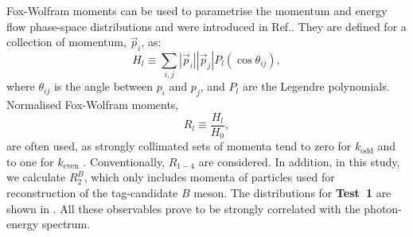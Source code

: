 Fox-Wolfram moments can be used to parametrise the momentum and energy flow phase-space distributions and were introduced in Ref.\cite{Fox:1978vu}.
They are defined for a collection of momentum, $\vec{p}_i$, as:
\begin{equation}
    H_l \equiv \sum_{i,j} |\vec{p}_i||\vec{p}_j|P_l(\cos\theta_{ij}),
\end{equation}
where $\theta_{ij}$ is the angle between $p_i$ and $p_j$, and $P_l$ are the Legendre polynomials.
Normalised Fox-Wolfram moments,
\begin{equation}
R_l\equiv \frac{H_l}{H_0},
\end{equation}
are often used, as strongly collimated sets of momenta tend to zero for $k_{\mathrm{odd}}$ and to one for $k_{\mathrm{even}}$ \cite{BaBar:2014omp}.
Conventionally, $R_{1-4}$ are considered.
In addition, in this study, we calculate $R_2^B$, which only includes momenta of particles used for reconstruction of the tag-candidate $B$ meson.
The distributions for \textbf{Test~1} are shown in .
All these observables prove to be strongly correlated with the photon-energy spectrum.

